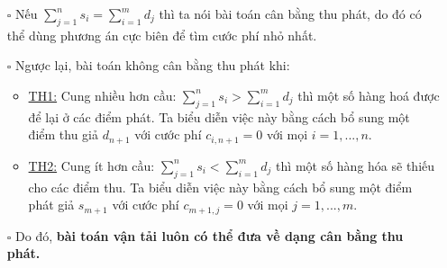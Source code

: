 \documentclass{article}
\begin{document}
\begin{itemize}
    \item [$\square$] Nếu $\sum_{j=1}^n s_i = \sum_{i=1}^m d_j$ thì ta nói bài toán cân bằng thu phát, do đó có thể dùng phương án cực biên để tìm cước phí nhỏ nhất.
    \item [$\square$] Ngược lại, bài toán không cân bằng thu phát khi:
    \begin{itemize}[label=\textbullet]
        \item \underline{TH1:} Cung nhiều hơn cầu: $\sum_{j=1}^n s_i > \sum_{i=1}^m d_j$ thì một số hàng hoá được để lại ở các điểm phát. Ta biểu diễn việc này bằng cách bổ sung một điểm thu giả $d_{n+1}$ với cước phí $c_{i,n+1}=0$ với mọi $i=1,...,n$.
        \item \underline{TH2:} Cung ít hơn cầu: $\sum_{j=1}^n s_i < \sum_{i=1}^m d_j$ thì một số hàng hóa sẽ thiếu cho các điểm thu. Ta biểu diễn việc này bằng cách bổ sung một điểm phát giả $s_{m+1}$ với cước phí $c_{m+1,j}=0$ với mọi $j=1,...,m$. 
    \end{itemize}
    \item [$\square$] Do đó, \textbf{bài toán vận tải luôn có thể đưa về dạng cân bằng thu phát.}
\end{itemize}
\end{document}
